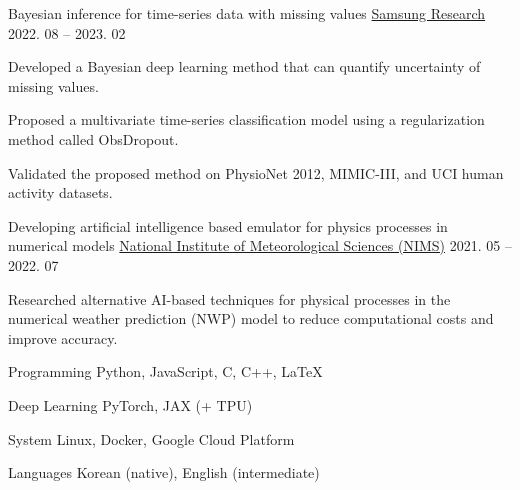 \documentclass[11pt, a4paper]{cv}
\begin{document}
\begin{cventries}

  \cvproject
    {Bayesian inference for time-series data with missing values} %
    {\href{https://research.samsung.com}{Samsung Research}} %
    {2022. 08 -- 2023. 02} %
    {
      \begin{cvitems} %
        \item {Developed a Bayesian deep learning method that can quantify uncertainty of missing values.}
        \item {Proposed a multivariate time-series classification model using a regularization method called ObsDropout.}
        \item {Validated the proposed method on PhysioNet 2012, MIMIC-III, and UCI human activity datasets.}
      \end{cvitems}
    }

  \cvproject
    {Developing artificial intelligence based emulator for physics processes in numerical models} %
    {\href{http://www.nims.go.kr/AE/MA/main.jsp}{National Institute of Meteorological Sciences (NIMS)}} %
    {2021. 05 -- 2022. 07} %
    {
      \begin{cvitems} %
        \item {Researched alternative AI-based techniques for physical processes in the numerical weather prediction (NWP) model to reduce computational costs and improve accuracy.}
      \end{cvitems}
    }

\end{cventries}

\begin{cvskills}

  \cvskill
    {Programming} %
    {Python, JavaScript, C, C++, LaTeX} %

  \cvskill
    {Deep Learning} %
    {PyTorch, JAX (+ TPU)} %

  \cvskill
    {System} %
    {Linux, Docker, Google Cloud Platform} %

  \cvskill
    {Languages} %
    {Korean (native), English (intermediate)} %

\end{cvskills}
\end{document}
